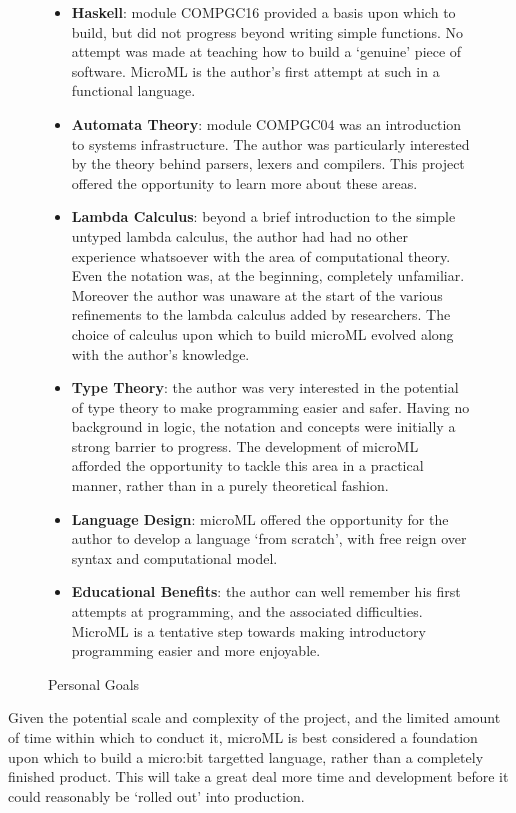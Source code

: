 \documentclass[12pt, a4paper]{report}
\begin{document}
\begin{figure}[H]
    \begin{itemize}
        \item \textbf{Haskell}: module COMPGC16 provided a basis upon which to build, but did not
            progress beyond writing simple functions. No attempt was made at teaching how to build a
            `genuine' piece of software. MicroML is the author's first attempt at such in a
            functional language.
        \item \textbf{Automata Theory}: module COMPGC04 was an introduction to systems infrastructure. The
            author was particularly interested by the theory behind parsers, lexers and compilers.
            This project offered the opportunity to learn more about these areas.
        \item \textbf{Lambda Calculus}:  beyond a brief introduction to the simple untyped lambda
            calculus, the author had had no other experience whatsoever with the area of computational
            theory. Even the notation was, at the beginning, completely unfamiliar. Moreover the
            author was unaware at the start of the various refinements to the lambda calculus added
            by researchers. The choice of calculus upon which to build microML evolved along with
            the author's knowledge.
        \item \textbf{Type Theory}: the author was very interested in the potential of type theory to make
            programming easier and safer. Having no background in logic, the notation and concepts
            were initially a strong barrier to progress. The development of microML afforded the
            opportunity to tackle this area in a practical manner, rather than in a purely
            theoretical fashion.
        \item \textbf{Language Design}: microML offered the opportunity for the author to develop a language
            `from scratch', with free reign over syntax and computational model. 
        \item \textbf{Educational Benefits}: the author can well remember his first attempts at programming,
            and the associated difficulties. MicroML is a tentative step towards making introductory
            programming easier and more enjoyable.
    \end{itemize}
    \caption{Personal Goals}
\label{fig:intentions}
\end{figure}

Given the potential scale and complexity of the project, and the limited amount of time within which
to conduct it, microML is best considered a foundation upon which to build a micro:bit targetted
language, rather than a completely finished product. This will take a great deal more time and
development before it could reasonably be `rolled out' into production.
\end{document}
